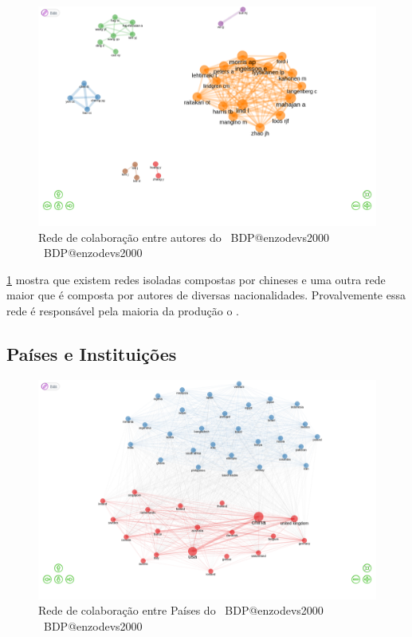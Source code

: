 \begin{figure}[H]
    \centering
    \includegraphics[width=1\textwidth]{experiments/enzodevs2000/AnaliseBibliometrica/BigDataInPolicy/Figures/Graficos/NovoDataset/Social/socialNetworkAuthors.png}
    \caption{Rede de colaboração entre autores do \dataset\ BDP@enzodevs2000
    \dataset\ BDP@enzodevs2000}
    \label{fig:enzodevs2000:BDP:newdataset:social:network_authors}
\end{figure}

\ref{fig:enzodevs2000:BDP:newdataset:social:network_authors} mostra que existem redes isoladas compostas por chineses e uma outra rede maior que é composta por autores de diversas nacionalidades. Provalvemente essa rede é responsável pela maioria da produção o \dataset.

\subsection{Países e Instituições}

\begin{figure}[H]
    \centering
    \includegraphics[width=1\textwidth]{experiments/enzodevs2000/AnaliseBibliometrica/BigDataInPolicy/Figures/Graficos/NovoDataset/Social/socialNetworkCountries.png}
    \caption{Rede de colaboração entre Países do \dataset\ BDP@enzodevs2000
    \dataset\ BDP@enzodevs2000}
    \label{fig:enzodevs2000:BDP:newdataset:social:network_countries}
\end{figure}

